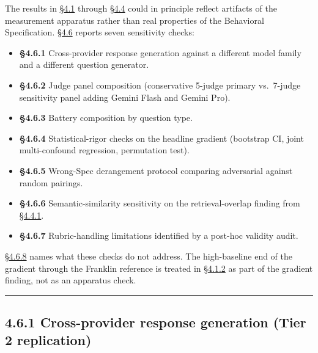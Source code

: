 The results in \hyperref[the-cross-subject-gradient-and-its-per-question-mechanism]{§4.1} through \hyperref[memory-system-composition]{§4.4} could in principle reflect artifacts of
the measurement apparatus rather than real properties of the Behavioral
Specification. \hyperref[robustness-and-sensitivity]{§4.6} reports seven sensitivity checks:

\begin{itemize}
\tightlist
\item
  \textbf{§4.6.1} Cross-provider response generation against a different
  model family and a different question generator.
\item
  \textbf{§4.6.2} Judge panel composition (conservative 5-judge primary
  vs.~7-judge sensitivity panel adding Gemini Flash and Gemini Pro).
\item
  \textbf{§4.6.3} Battery composition by question type.
\item
  \textbf{§4.6.4} Statistical-rigor checks on the headline gradient
  (bootstrap CI, joint multi-confound regression, permutation test).
\item
  \textbf{§4.6.5} Wrong-Spec derangement protocol comparing adversarial
  against random pairings.
\item
  \textbf{§4.6.6} Semantic-similarity sensitivity on the
  retrieval-overlap finding from \hyperref[cross-system-retrieval-providers-do-not-converge]{§4.4.1}.
\item
  \textbf{§4.6.7} Rubric-handling limitations identified by a post-hoc
  validity audit.
\end{itemize}

\hyperref[class-level-llm-dependence-the-limitation-no-robustness-check-resolves]{§4.6.8} names what these checks do not address. The high-baseline end of
the gradient through the Franklin reference is treated in \hyperref[the-gradient-at-the-high-baseline-end-franklin-reference]{§4.1.2} as part
of the gradient finding, not as an apparatus check.

\begin{center}\rule{0.5\linewidth}{0.5pt}\end{center}

\hypertarget{cross-provider-response-generation-tier-2-replication}{%
\subsection{4.6.1 Cross-provider response generation (Tier 2
replication)}\label{cross-provider-response-generation-tier-2-replication}}


